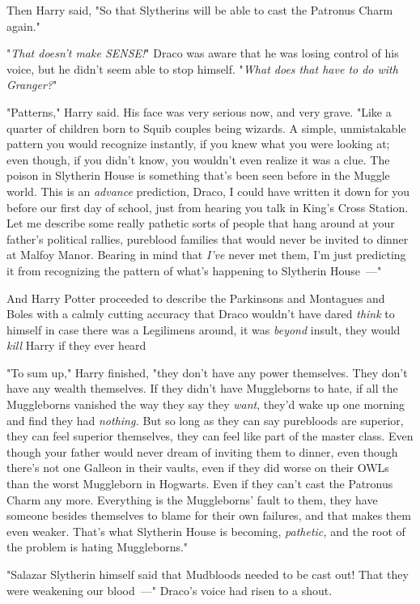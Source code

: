 Then Harry said, "So that Slytherins will be able to cast the Patronus Charm
again."

"\emph{That{\el} doesn't{\el} make{\el} SENSE!}" Draco was aware that
he was losing control of his voice, but he didn't seem able to stop himself.
"\emph{What does that have to do with Granger?}"

"Patterns," Harry said. His face was very serious now, and very grave. "Like a
quarter of children born to Squib couples being wizards. A simple, unmistakable
pattern you would recognize instantly, if you knew what you were looking at;
even though, if you didn't know, you wouldn't even realize it was a clue. The
poison in Slytherin House is something that's been seen before in the Muggle
world. This is an \emph{advance} prediction, Draco, I could have written it
down for you before our first day of school, just from hearing you talk in
King's Cross Station. Let me describe some really pathetic sorts of people that
hang around at your father's political rallies, pureblood families that would
never be invited to dinner at Malfoy Manor. Bearing in mind that \emph{I've}
never met them, I'm just predicting it from recognizing the pattern of what's
happening to Slytherin House~---"

And Harry Potter proceeded to describe the Parkinsons and Montagues and Boles
with a calmly cutting accuracy that Draco wouldn't have dared \emph{think} to
himself in case there was a Legilimens around, it was \emph{beyond} insult,
they would \emph{kill} Harry if they ever heard{\el}

"To sum up," Harry finished, "they don't have any power themselves. They don't
have any wealth themselves. If they didn't have Muggleborns to hate, if all the
Muggleborns vanished the way they say they \emph{want}, they'd wake up one
morning and find they had \emph{nothing.} But so long as they can say
purebloods are superior, they can feel superior themselves, they can feel like
part of the master class. Even though your father would never dream of inviting
them to dinner, even though there's not one Galleon in their vaults, even if
they did worse on their OWLs than the worst Muggleborn in Hogwarts. Even if
they can't cast the Patronus Charm any more. Everything is the Muggleborns'
fault to them, they have someone besides themselves to blame for their own
failures, and that makes them even weaker. That's what Slytherin House is
becoming, \emph{pathetic,} and the root of the problem is hating Muggleborns."

"Salazar Slytherin himself said that Mudbloods needed to be cast out! That they
were weakening our blood~---" Draco's voice had risen to a shout.

